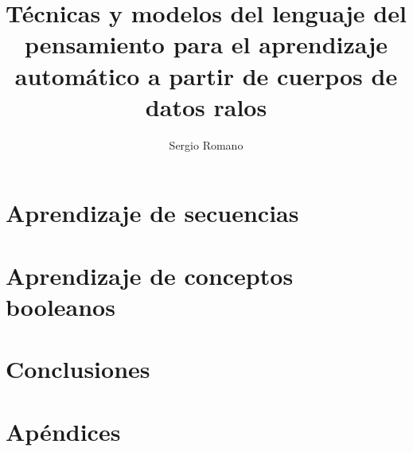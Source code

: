 \documentclass[a4paper,12pt,oneside,spanish]{book}
\title{Técnicas y modelos del lenguaje del pensamiento para el aprendizaje automático a partir de cuerpos de datos ralos}
\author{Sergio Romano}
\begin{document}
    
\restoregeometry 

    
    
    
    
\tableofcontents


\setlength{\parskip}{0.5em}

    
    \part{Aprendizaje de secuencias}\label{parte:secuencias}
        
        
        
    \part{Aprendizaje de conceptos booleanos}\label{parte:conceptos}
        
        
        
    \part{Conclusiones}
        
    \part{Apéndices}
        \appendix
        
        
        
    
    
    
\end{document}
